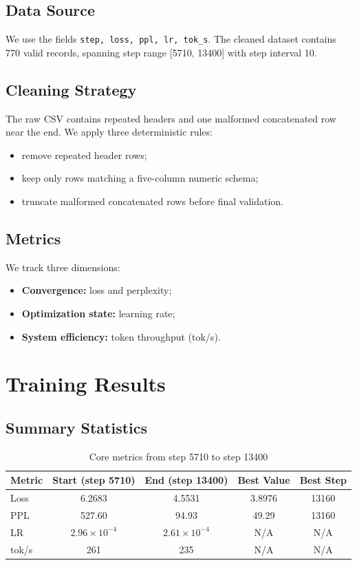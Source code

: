 \documentclass[12pt,a4paper]{article}
\begin{document}
\subsection{Data Source}
We use the fields \texttt{step, loss, ppl, lr, tok\_s}. The cleaned dataset contains 770 valid records, spanning step range [5710, 13400] with step interval 10.

\subsection{Cleaning Strategy}
The raw CSV contains repeated headers and one malformed concatenated row near the end. We apply three deterministic rules:
\begin{itemize}
  \item remove repeated header rows;
  \item keep only rows matching a five-column numeric schema;
  \item truncate malformed concatenated rows before final validation.
\end{itemize}

\subsection{Metrics}
We track three dimensions:
\begin{itemize}
  \item \textbf{Convergence:} loss and perplexity;
  \item \textbf{Optimization state:} learning rate;
  \item \textbf{System efficiency:} token throughput (tok/s).
\end{itemize}

\section{Training Results}
\subsection{Summary Statistics}
\begin{table}[H]
\centering
\caption{Core metrics from step 5710 to step 13400}
\begin{tabular}{lcccc}
\toprule
Metric & Start (step 5710) & End (step 13400) & Best Value & Best Step \\
\midrule
Loss & 6.2683 & 4.5531 & 3.8976 & 13160 \\
PPL & 527.60 & 94.93 & 49.29 & 13160 \\
LR & $2.96\times10^{-4}$ & $2.61\times10^{-4}$ & N/A & N/A \\
tok/s & 261 & 235 & N/A & N/A \\
\bottomrule
\end{tabular}
\end{table}
\end{document}
